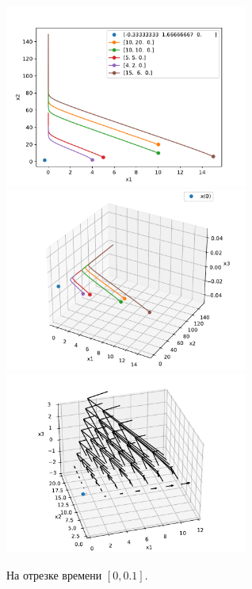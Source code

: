     \begin{figure}[H]
        \centering
        \includegraphics[width=8cm]{pictures/x3_0phase.pdf}
        \includegraphics[width=8cm]{pictures/x3_0phase3.pdf}
        \includegraphics[width=8cm]{pictures/x3_0vector3.pdf}
        \caption{На отрезке времени \( [0, 0.1] \).}
    \end{figure}

